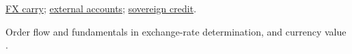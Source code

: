 \begin{qfmethod}
 \hyperref[mod:fx-carry-trade]{FX carry}; \hyperref[def:macroeconomic-indicators]{external accounts}; \hyperref[def:sovereign-credit-defaults]{sovereign credit}.

 Order flow and fundamentals in exchange-rate determination, and currency value \citep{wide-menkhoff-value}.

\end{qfmethod}
